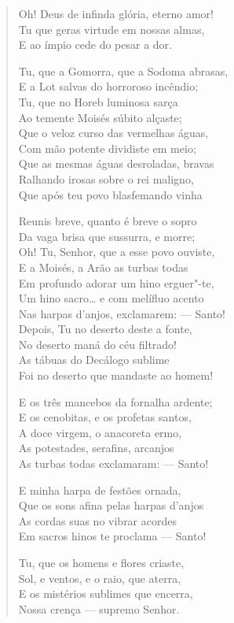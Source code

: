 \begin{verse}
Oh! Deus de infinda glória, eterno amor!\\
Tu que geras virtude em nossas almas,\\
E ao ímpio cede do pesar a dor.

Tu, que a Gomorra, que a Sodoma abrasas,\\
E a Lot salvas do horroroso incêndio;\\
Tu, que no Horeb luminosa sarça\\
Ao temente Moisés súbito alçaste;\\
Que o veloz curso das vermelhas águas,\\
Com mão potente dividiste em meio;\\
Que as mesmas águas desroladas, bravas\\
Ralhando irosas sobre o rei maligno,\\
Que após teu povo blasfemando vinha

Reunis breve, quanto é breve o sopro\\
Da vaga brisa que sussurra, e morre;\\
Oh! Tu, Senhor, que a esse povo ouviste,\\
E a Moisés, a Arão as turbas todas\\
Em profundo adorar um hino erguer"-te,\\
Um hino sacro\ldots{} e com melífluo acento\\
Nas harpas d'anjos, exclamarem: --- Santo!\\
Depois, Tu no deserto deste a fonte,\\
No deserto maná do céu filtrado!\\
As tábuas do Decálogo sublime\\
Foi no deserto que mandaste ao homem!

E os três mancebos da fornalha ardente;\\
E os cenobitas, e os profetas santos,\\
A doce virgem, o anacoreta ermo,\\
As potestades, serafins, arcanjos\\
As turbas todas exclamaram: --- Santo!

E minha harpa de festões ornada,\\
Que os sons afina pelas harpas d'anjos\\
As cordas suas no vibrar acordes\\
Em sacros hinos te proclama --- Santo!

Tu, que os homens e flores criaste,\\
Sol, e ventos, e o raio, que aterra,\\
E os mistérios sublimes que encerra,\\
Nossa crença --- supremo Senhor.


\end{verse}
